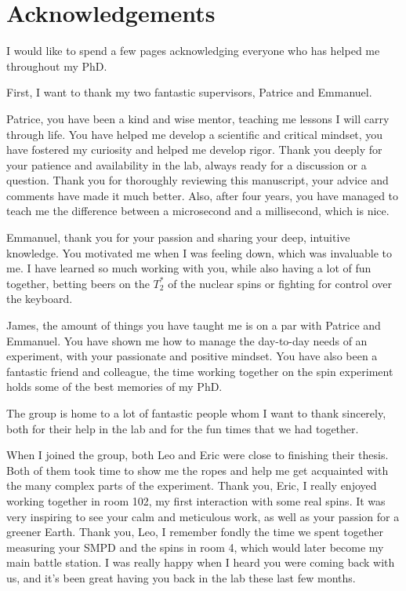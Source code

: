 \chapter*{Acknowledgements}

I would like to spend a few pages acknowledging everyone who has helped me throughout my PhD.

First, I want to thank my two fantastic supervisors, Patrice and Emmanuel.

Patrice, you have been a kind and wise mentor, teaching me lessons I will carry through life. You have helped me develop a scientific and critical mindset, you have fostered my curiosity and helped me develop rigor. Thank you deeply for your patience and availability in the lab, always ready for a discussion or a question. Thank you for thoroughly reviewing this manuscript, your advice and comments have made it much better. Also, after four years, you have managed to teach me the difference between a microsecond and a millisecond, which is nice.

Emmanuel, thank you for your passion and sharing your deep, intuitive knowledge. You motivated me when I was feeling down, which was invaluable to me. I have learned so much working with you, while also having a lot of fun together, betting beers on the $T_2^*$ of the nuclear spins or fighting for control over the keyboard.

James, the amount of things you have taught me is on a par with Patrice and Emmanuel. You have shown me how to manage the day-to-day needs of an experiment, with your passionate and positive mindset. You have also been a fantastic friend and colleague, the time working together on the spin experiment holds some of the best memories of my PhD.

The group is home to a lot of fantastic people whom I want to thank sincerely, both for their help in the lab and for the fun times that we had together.

When I joined the group, both Leo and Eric were close to finishing their thesis. Both of them took time to show me the ropes and help me get acquainted with the many complex parts of the experiment. Thank you, Eric, I really enjoyed working together in room 102, my first interaction with some real spins. It was very inspiring to see your calm and meticulous work, as well as your passion for a greener Earth. Thank you, Leo, I remember fondly the time we spent together measuring your SMPD and the spins in room 4, which would later become my main battle station. I was really happy when I heard you were coming back with us, and it's been great having you back in the lab these last few months.

